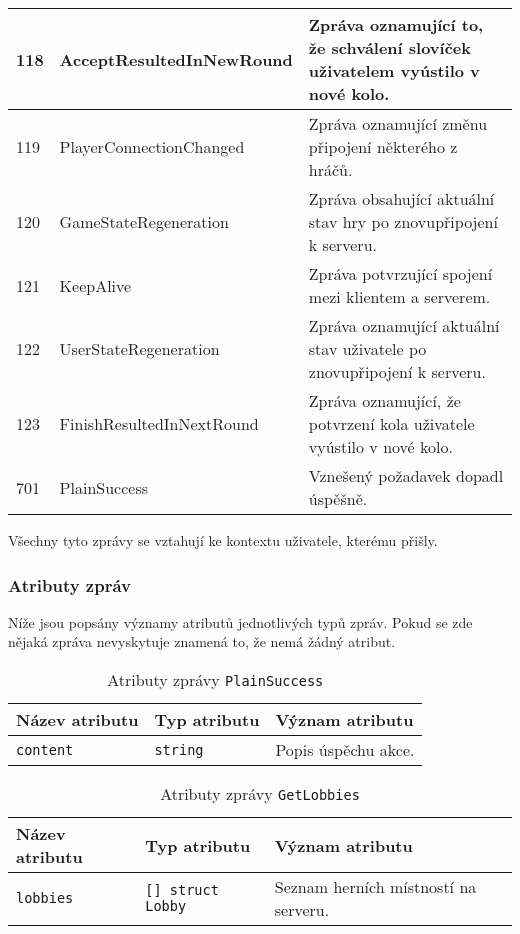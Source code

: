 \documentclass[12pt, a4paper]{article}
\begin{document}
\pagebreak

\begin{center}
		\begin{tabularx}{\textwidth}{|l|l|X|}
			\hline
			118          &AcceptResultedInNewRound&Zpráva oznamující to, že schválení slovíček uživatelem vyústilo v nové kolo.\\
			\hline
			119          &PlayerConnectionChanged  &Zpráva oznamující změnu připojení některého z hráčů.\\
			\hline
			120          &GameStateRegeneration              &Zpráva obsahující aktuální stav hry po znovupřipojení k serveru.\\
			\hline
			121          &KeepAlive  &Zpráva potvrzující spojení mezi klientem a serverem.\\
			\hline
			122          &UserStateRegeneration&Zpráva oznamující aktuální stav uživatele po znovupřipojení k serveru.\\
			\hline
			123          &FinishResultedInNextRound&Zpráva oznamující, že potvrzení kola uživatele vyústilo v nové kolo.\\
			\hline
			701&PlainSuccess&Vznešený požadavek dopadl úspěšně.\\
			\hline
		\end{tabularx}
\end{center}  
Všechny tyto zprávy se vztahují ke kontextu uživatele, kterému přišly.
\subsubsection{Atributy zpráv}
		Níže jsou popsány významy atributů jednotlivých typů zpráv. Pokud se zde nějaká zpráva nevyskytuje znamená to, že nemá žádný atribut.
		
				
\begin{center}
		\begin{table}[!ht]
		     \caption{Atributy zprávy \texttt{PlainSuccess}}
		\begin{tabularx}{\textwidth}{|l|l|X|}
			\hline
			\textbf{Název atributu} & \textbf{Typ atributu} & \textbf{Význam atributu} \\ 
			\hline
			\texttt{content}          &\texttt{string}&Popis úspěchu akce.\\
			\hline
		\end{tabularx}
		\end{table}
\end{center}  

				
\begin{center}
		\begin{table}[!ht]
		     \caption{Atributy zprávy \texttt{GetLobbies}}
		\begin{tabularx}{\textwidth}{|l|l|X|}
			\hline
			\textbf{Název atributu} & \textbf{Typ atributu} & \textbf{Význam atributu} \\ 
			\hline
			\texttt{lobbies}          &\texttt{[] struct Lobby}&Seznam herních místností na serveru.\\
			\hline
		\end{tabularx}
		\end{table}
\end{center}  
\end{document}

